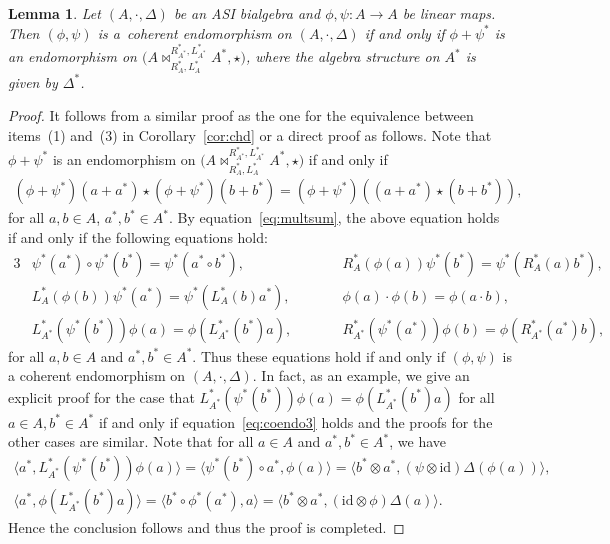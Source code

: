 \documentclass[pdftex]{sigma}
\numberwithin{equation}{section}
\newtheorem{Lemma}[Theorem]{Lemma}
\newcommand{\id}{\mathrm{id}}
\begin{document}
\begin{Lemma}\label{lem:endo}
 Let $(A, \cdot, \Delta)$ be an ASI bialgebra and $\phi, \psi\colon A \to A$ be linear maps.
 Then $(\phi, \psi)$ is a~coherent endomorphism on $(A, \cdot, \Delta)$ if and only if $\phi + \psi^*$ is an endomorphism on ${\big(A \bowtie_{R_A^*, L_A^*}^{R_{A^*}^*, L_{A^*}^*} A^*, \star\big)}$, where the algebra structure on $A^*$ is given by $\Delta^*$.
\end{Lemma}
\begin{proof}
It follows from a similar proof as the one for the equivalence between items~(1) and~(3) in Corollary~\ref{cor:chd} or a direct proof as follows.
Note that $\phi + \psi^*$ is an endomorphism on ${\big(A \bowtie_{R_A^*, L_A^*}^{R_{A^*}^*, L_{A^*}^*} A^*, \star\big)}$ if and only if
 \begin{gather*}
 (\phi + \psi^*)(a + a^*) \star (\phi + \psi^*)(b+b^*) = (\phi + \psi^*)((a+a^*) \star (b+b^*)),
 \end{gather*}
for all $a, b \in A$, $a^*, b^* \in A^*$. By equation~\eqref{eq:multsum}, the above equation holds if and only if the following equations hold:
 \begin{alignat*}{3}
 &\psi^*(a^*) \circ \psi^*(b^*) = \psi^*(a^* \circ b^*), \qquad&&R_{A}^*(\phi(a))\psi^*(b^*) = \psi^*(R_{A}^*(a) b^*),& \\
 &L_{A}^*(\phi(b))\psi^*(a^*) = \psi^*(L_{A}^*(b) a^*), \qquad&& \phi(a) \cdot \phi(b) = \phi(a \cdot b),& \\
 &L_{A^*}^*(\psi^*(b^*))\phi(a) = \phi(L_{A^*}^*(b^*) a), \qquad &&R_{A^*}^*(\psi^*(a^*))\phi(b) = \phi(R_{A^*}^*(a^*) b),&
 \end{alignat*}
 for all $a, b \in A$ and $a^*, b^* \in A^*$. Thus these equations hold if and only if $(\phi, \psi)$ is a coherent endomorphism on $(A, \cdot,
 \Delta)$. In fact, as an example, we give an explicit proof for the case that $L_{A^*}^*(\psi^*(b^*))\phi(a) = \phi(L_{A^*}^*(b^*) a)$ for all $a\in A, b^*\in A^*$ if and only if equation~\eqref{eq:coendo3}
 holds and the proofs for the other cases are similar. Note
 that for all $a \in A$ and $a^*, b^* \in A^*$, we have
 \begin{gather*}
 \langle a^*, L_{A^*}^*(\psi^*(b^*))\phi(a)\rangle = \langle \psi^*(b^*) \circ a^*, \phi(a)\rangle = \langle b^* \otimes a^*, (\psi \otimes \id)\Delta(\phi(a))\rangle, \\
 \langle a^*, \phi(L_{A^*}^*(b^*) a)\rangle = \langle b^* \circ \phi^*(a^*), a\rangle = \langle b^* \otimes a^*, (\id \otimes
 \phi)\Delta(a)\rangle.
 \end{gather*}
 Hence the conclusion follows and thus the proof is completed.
\end{proof}
\end{document}
